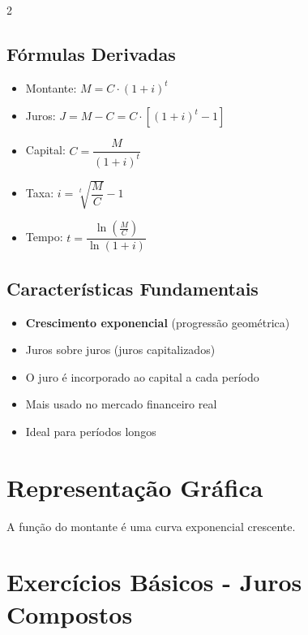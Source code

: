 \documentclass[11pt]{article}
\begin{document}
\begin{multicols}{2}
\subsection*{Fórmulas Derivadas}
\begin{itemize}
\item Montante: $M = C \cdot (1 + i)^t$
\item Juros: $J = M - C = C \cdot [(1 + i)^t - 1]$
\item Capital: $C = \dfrac{M}{(1 + i)^t}$
\item Taxa: $i = \sqrt[t]{\dfrac{M}{C}} - 1$
\item Tempo: $t = \dfrac{\ln\left(\frac{M}{C}\right)}{\ln(1 + i)}$
\end{itemize}

\subsection*{Características Fundamentais}
\begin{itemize}
\item \textbf{Crescimento exponencial} (progressão geométrica)
\item Juros sobre juros (juros capitalizados)
\item O juro é incorporado ao capital a cada período
\item Mais usado no mercado financeiro real
\item Ideal para períodos longos
\end{itemize}

\section*{Representação Gráfica}

\begin{center}
\end{center}

A função do montante é uma curva exponencial crescente.

\section*{Exercícios Básicos - Juros Compostos}


\end{multicols}
\end{document}
